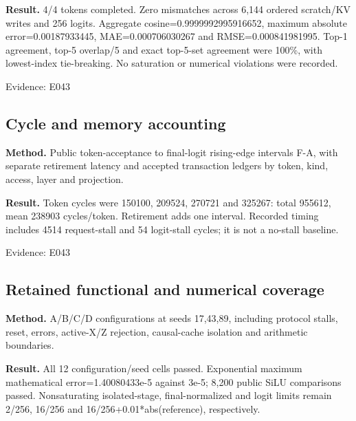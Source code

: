 \documentclass[11pt,a4paper]{article}
\begin{document}
\textbf{Result.} 4/\allowbreak{}4 tokens completed. Zero mismatches across 6,\allowbreak{}144 ordered scratch/\allowbreak{}KV writes and 256 logits. Aggregate cosine=\allowbreak{}0.9999992995916652,\allowbreak{} maximum absolute error=\allowbreak{}0.00187933445,\allowbreak{} MAE=\allowbreak{}0.000706030267 and RMSE=\allowbreak{}0.000841981995. Top-1 agreement,\allowbreak{} top-5 overlap/\allowbreak{}5 and exact top-5-set agreement were 100\%,\allowbreak{} with lowest-index tie-breaking. No saturation or numerical violations were recorded.

{\small Evidence: E043}

\subsection{Cycle and memory accounting}

\textbf{Method.} Public token-acceptance to final-logit rising-edge intervals F-A,\allowbreak{} with separate retirement latency and accepted transaction ledgers by token,\allowbreak{} kind,\allowbreak{} access,\allowbreak{} layer and projection.

\textbf{Result.} Token cycles were 150100,\allowbreak{} 209524,\allowbreak{} 270721 and 325267: total 955612,\allowbreak{} mean 238903 cycles/\allowbreak{}token. Retirement adds one interval. Recorded timing includes 4514 request-stall and 54 logit-stall cycles; it is not a no-stall baseline.

{\small Evidence: E043}

\subsection{Retained functional and numerical coverage}

\textbf{Method.} A/\allowbreak{}B/\allowbreak{}C/\allowbreak{}D configurations at seeds 17,\allowbreak{}43,\allowbreak{}89,\allowbreak{} including protocol stalls,\allowbreak{} reset,\allowbreak{} errors,\allowbreak{} active-X/\allowbreak{}Z rejection,\allowbreak{} causal-cache isolation and arithmetic boundaries.

\textbf{Result.} All 12 configuration/\allowbreak{}seed cells passed. Exponential maximum mathematical error=\allowbreak{}1.40080433e-5 against 3e-5; 8,\allowbreak{}200 public SiLU comparisons passed. Nonsaturating isolated-stage,\allowbreak{} final-normalized and logit limits remain 2/\allowbreak{}256,\allowbreak{} 16/\allowbreak{}256 and 16/\allowbreak{}256+\allowbreak{}0.01*\allowbreak{}abs(\allowbreak{}reference)\allowbreak{},\allowbreak{} respectively.
\end{document}
